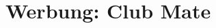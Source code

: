 \newpage
\section{Werbung: Club Mate}
\label{sec:clubmate}
\charaktere{-}
\setting{-}
\sound{-}
\licht{-}
\requisiten{-}
